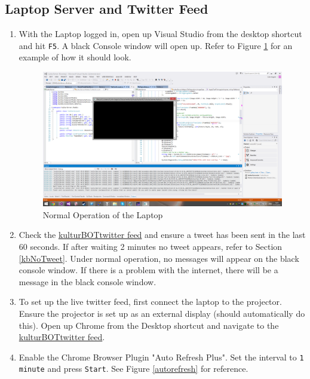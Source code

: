 \documentclass[]{article}
\newcommand{\kb}{kulturBOT}
\newcommand{\kbspace}{\kb \space}
\begin{document}
\subsection{Laptop Server and Twitter Feed}
\begin{enumerate}
	\item With the Laptop logged in, open up Visual Studio from the desktop shortcut and hit \texttt{F5}. A black Console window will open up. Refer to Figure \ref{normalVS} for an example of how it should look.
	
	\begin{figure}[h!]
		\centering
	    \includegraphics[width=1\textwidth]{img/normalVSlook.png}
	    \caption{Normal Operation of the Laptop}
	    \label{normalVS}
	\end{figure}
	
	\item Check the \href{https://twitter.com/kulturBOT}{\kbspace twitter feed} and ensure a tweet has been sent in the last 60 seconds. If after waiting 2 minutes no tweet appears, refer to Section \ref{kbNoTweet}. Under normal operation, no messages will appear on the black console window. If there is a problem with the internet, there will be a message in the black console window.
	
	\item To set up the live twitter feed, first connect the laptop to the projector. Ensure the projector is set up as an external display (should automatically do this). Open up Chrome from the Desktop shortcut and navigate to the \href{https://twitter.com/kulturBOT}{\kbspace twitter feed}.
	
	\item Enable the Chrome Browser Plugin "Auto Refresh Plus". Set the interval to \texttt{1 minute} and press \texttt{Start}. See Figure \ref{autorefresh} for reference.
	

\end{enumerate}
\end{document}
